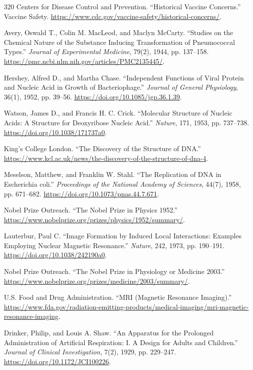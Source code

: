 \documentclass[12pt,oneside]{book}
\begin{document}
\begin{thebibliography}{320}
Centers for Disease Control and Prevention. ``Historical Vaccine Concerns.''
Vaccine Safety. \url{https://www.cdc.gov/vaccine-safety/historical-concerns/}.

Avery, Oswald T., Colin M. MacLeod, and Maclyn McCarty. ``Studies on the
Chemical Nature of the Substance Inducing Transformation of Pneumococcal
Types.'' \emph{Journal of Experimental Medicine}, 79(2), 1944, pp. 137--158.
\url{https://pmc.ncbi.nlm.nih.gov/articles/PMC2135445/}.

Hershey, Alfred D., and Martha Chase. ``Independent Functions of Viral
Protein and Nucleic Acid in Growth of Bacteriophage.'' \emph{Journal of
General Physiology}, 36(1), 1952, pp. 39--56.
\url{https://doi.org/10.1085/jgp.36.1.39}.

Watson, James D., and Francis H. C. Crick. ``Molecular Structure of Nucleic
Acids: A Structure for Deoxyribose Nucleic Acid.'' \emph{Nature}, 171,
1953, pp. 737--738. \url{https://doi.org/10.1038/171737a0}.

King's College London. ``The Discovery of the Structure of DNA.''
\url{https://www.kcl.ac.uk/news/the-discovery-of-the-structure-of-dna-4}.

Meselson, Matthew, and Franklin W. Stahl. ``The Replication of DNA in
Escherichia coli.'' \emph{Proceedings of the National Academy of Sciences},
44(7), 1958, pp. 671--682. \url{https://doi.org/10.1073/pnas.44.7.671}.

Nobel Prize Outreach. ``The Nobel Prize in Physics 1952.''
\url{https://www.nobelprize.org/prizes/physics/1952/summary/}.

Lauterbur, Paul C. ``Image Formation by Induced Local Interactions:
Examples Employing Nuclear Magnetic Resonance.'' \emph{Nature}, 242, 1973,
pp. 190--191. \url{https://doi.org/10.1038/242190a0}.

Nobel Prize Outreach. ``The Nobel Prize in Physiology or Medicine 2003.''
\url{https://www.nobelprize.org/prizes/medicine/2003/summary/}.

U.S. Food and Drug Administration. ``MRI (Magnetic Resonance Imaging).''
\url{https://www.fda.gov/radiation-emitting-products/medical-imaging/mri-magnetic-resonance-imaging}.

Drinker, Philip, and Louis A. Shaw. ``An Apparatus for the Prolonged
Administration of Artificial Respiration: I. A Design for Adults and
Children.'' \emph{Journal of Clinical Investigation}, 7(2), 1929,
pp. 229--247. \url{https://doi.org/10.1172/JCI100226}.


\end{thebibliography}
\end{document}
